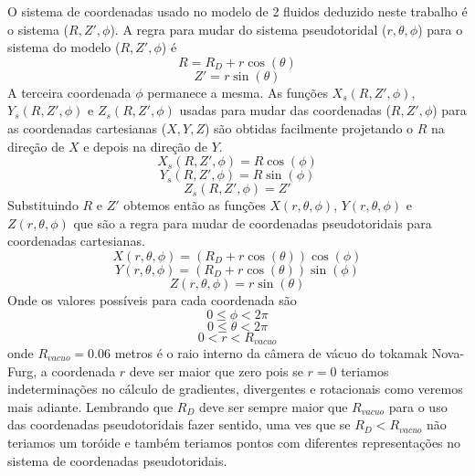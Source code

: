 \documentclass[12pt,oneside,a4paper]{abntex2}
\begin{document}
O sistema de coordenadas usado no modelo de 2 fluidos deduzido neste trabalho é o sistema ($R,Z',\phi$). A regra para mudar do sistema pseudotoridal ($r,\theta,\phi$) para o sistema do modelo ($R,Z',\phi$) é
\begin{equation}
 R = R_D+r \cos(\theta)
\end{equation}
\begin{equation}
 Z' = r \sin(\theta)
 \end{equation}
A terceira coordenada $\phi$ permanece a mesma. As funções $X_s(R,Z',\phi)$, $Y_s(R,Z',\phi)$ e $Z_s(R,Z',\phi)$ usadas para mudar das coordenadas ($R,Z',\phi$) para as coordenadas cartesianas ($X,Y,Z$) são obtidas facilmente projetando o $R$ na direção de $X$ e depois na direção de $Y$.
\begin{equation}
X_s(R,Z',\phi) = R \cos(\phi)
\end{equation}
\begin{equation}
Y_s(R,Z',\phi) = R \sin(\phi)
\end{equation}
\begin{equation}
Z_s(R,Z',\phi) = Z'
\end{equation}
Substituindo $R$ e $Z'$ obtemos então as funções $X(r,\theta,\phi)$, $Y(r,\theta,\phi)$ e $Z(r,\theta,\phi)$ que são a regra para mudar de coordenadas pseudotoridais para coordenadas cartesianas.
\begin{equation}
\label{rX}
X(r,\theta,\phi) = (R_D+r \cos(\theta)) \cos(\phi)
\end{equation}
\begin{equation}
\label{rY}
Y(r,\theta,\phi) = (R_D+r \cos(\theta)) \sin(\phi)
\end{equation}
\begin{equation}
\label{rZ}
Z(r,\theta,\phi) = r \sin(\theta)
\end{equation}
Onde os valores possíveis para cada coordenada são
\begin{equation}
0 \leq \phi < 2 \pi
\end{equation}
\begin{equation}
0 \leq \theta < 2 \pi
\end{equation}
\begin{equation}
\label{maxr}
0 < r < R_{vacuo}
\end{equation}
onde $R_{vacuo}=0.06$ metros é o raio interno da câmera de vácuo do tokamak Nova-Furg, a coordenada $r$ deve ser maior que zero pois se $r=0$ teriamos indeterminações no cálculo de gradientes, divergentes e rotacionais como veremos mais adiante. Lembrando que $R_D$ deve ser sempre maior que $R_{vacuo}$ para o uso das coordenadas pseudotoridais fazer sentido, uma ves que se $R_D<R_{vacuo}$ não teriamos um toróide e também teriamos pontos com diferentes representações no sistema de coordenadas pseudotoridais.
\end{document}
